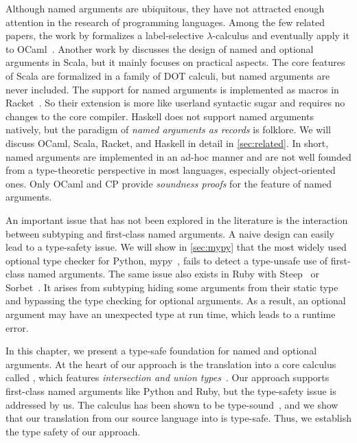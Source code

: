 Although named arguments are ubiquitous, they have not attracted enough
attention in the research of programming languages. Among the few related
papers, the work by \citet{garrigue1994label} formalizes a label-selective
$\lambda$-calculus and eventually apply it to OCaml~\citep{garrigue2001labeled}.
Another work by \citet{rytz2010named} discusses the design of named and optional
arguments in Scala, but it mainly focuses on practical aspects. The core
features of Scala are formalized in a family of DOT calculi, but named arguments
are never included. The support for named arguments is implemented as macros in
Racket~\citep{flatt2009keyword}. So their extension is more like userland
syntactic sugar and requires no changes to the core compiler. Haskell does not
support named arguments natively, but the paradigm of \emph{named arguments as
records} is folklore. We will discuss OCaml, Scala, Racket, and Haskell in
detail in \autoref{sec:related}. In short, named arguments are implemented in an
ad-hoc manner and are not well founded from a type-theoretic perspective in most
languages, especially object-oriented ones. Only OCaml and CP provide
\emph{soundness proofs} for the feature of named arguments.

An important issue that has not been explored in the literature is the
interaction between subtyping and first-class named arguments. A naive design
can easily lead to a type-safety issue. We will show in \autoref{sec:mypy} that
the most widely used optional type checker for Python, mypy~\citep{mypy}, fails
to detect a type-unsafe use of first-class named arguments. The same issue also
exists in Ruby with Steep~\citep{steep} or Sorbet~\citep{sorbet}. It arises from
subtyping hiding some arguments from their static type and bypassing the type
checking for optional arguments. As a result, an optional argument may have an
unexpected type at run time, which leads to a runtime error.

In this chapter, we present a type-safe foundation for named and optional
arguments. At the heart of our approach is the translation into a core calculus
called \lambdaiu, which features \emph{intersection and union
types}~\citep{barbanera1995intersection,frisch2008semantic,dunfield2014elaborating}.
Our approach supports first-class named arguments like Python and Ruby, but the
type-safety issue is addressed by us. The \lambdaiu calculus has been shown to
be type-sound~\citep{rehman2023blend}, and we show that our translation from our
source language into \lambdaiu is type-safe. Thus, we establish the type safety
of our approach.
